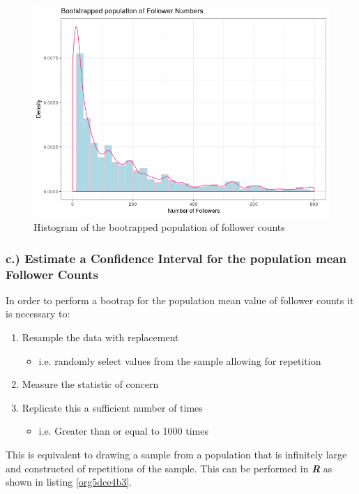 \documentclass[11pt]{article}
\begin{document}
\begin{figure}[htbp]
\centering
\includegraphics[width=12cm]{./Figures/BootStrap_Pop.png}
\caption{\label{fig:org90f6455}Histogram of the bootrapped population of follower counts}
\end{figure}

\subsubsection{c.) Estimate a Confidence Interval for the population mean Follower Counts}
\label{sec:orgdc99e0f}
In order to perform a bootrap for the population mean value of follower counts it is necessary to:

\begin{enumerate}
\item Resample the data with replacement
\begin{itemize}
\item i.e. randomly select values from the sample allowing for repetition
\end{itemize}
\item Measure the statistic of concern
\item Replicate this a sufficient number of times
\begin{itemize}
\item i.e. Greater than or equal to 1000 times \cite[Ch. 5]{davison1997}
\end{itemize}
\end{enumerate}

This is equivalent to drawing a sample from a population that is infinitely large and constructed of repetitions of the sample. This can be performed in \textbf{\emph{R}} as shown in listing \ref{org5dce4b3}.
\end{document}
